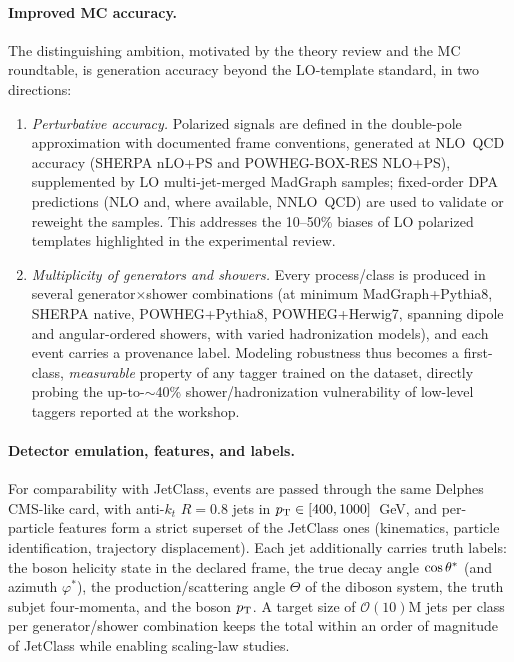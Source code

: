 \paragraph{Improved MC accuracy.} The distinguishing ambition, motivated by the
theory review and the MC roundtable, is generation accuracy beyond the
LO-template standard, in two directions:
\begin{enumerate}
\item \emph{Perturbative accuracy.} Polarized signals are defined in the
double-pole approximation with documented frame conventions, generated at
NLO~QCD accuracy (SHERPA nLO+PS and POWHEG-BOX-RES NLO+PS), supplemented by LO
multi-jet-merged MadGraph samples; fixed-order DPA predictions (NLO and, where
available, NNLO~QCD) are used to validate or reweight the samples. This
addresses the 10--50\% biases of LO polarized templates highlighted in the
experimental review.
\item \emph{Multiplicity of generators and showers.} Every process/class is
produced in several generator$\times$shower combinations (at minimum
MadGraph+Pythia8, SHERPA native, POWHEG+Pythia8, POWHEG+Herwig7, spanning
dipole and angular-ordered showers, with varied hadronization models), and
each event carries a provenance label. Modeling robustness thus becomes a
first-class, \emph{measurable} property of any tagger trained on the dataset,
directly probing the up-to-$\sim$40\% shower/hadronization vulnerability of
low-level taggers reported at the workshop.
\end{enumerate}

\paragraph{Detector emulation, features, and labels.} For comparability with
JetClass, events are passed through the same Delphes CMS-like card, with
anti-$k_t$ $R=0.8$ jets in $p_{\mathrm{T}}\in[400,1000]$~GeV, and per-particle features
form a strict superset of the JetClass ones (kinematics, particle
identification, trajectory displacement). Each jet additionally carries truth
labels: the boson helicity state in the declared frame, the true decay angle
$\cos\theta^{*}$ (and azimuth $\varphi^{*}$), the production/scattering angle
$\Theta$ of the diboson system, the truth subjet four-momenta, and the boson
$p_{\mathrm{T}}$. A target size of $\mathcal{O}(10)$M jets per class per
generator/shower combination keeps the total within an order of magnitude of
JetClass while enabling scaling-law studies.

